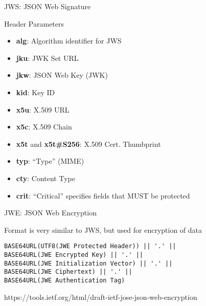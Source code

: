 \begin{frame}{JWS: JSON Web Signature}

Header Parameters

\begin{itemize}
\itemsep1pt\parskip0pt
\item
  \textbf{alg}: Algorithm identifier for JWS
\item
  \textbf{jku}: JWK Set URL
\item
  \textbf{jkw}: JSON Web Key (JWK)
\item
  \textbf{kid}: Key ID
\item
  \textbf{x5u}: X.509 URL
\item
  \textbf{x5c}: X.509 Chain
\item
  \textbf{x5t} and \textbf{x5t\#S256}: X.509 Cert. Thumbprint
\item
  \textbf{typ}: ``Type'' (MIME)
\item
  \textbf{cty}: Content Type
\item
  \textbf{crit}: ``Critical'' specifies fields that MUST be protected
\end{itemize}

\end{frame}

\begin{frame}[fragile]{JWE: JSON Web Encryption}

Format is very similar to JWS, but used for encryption of data

\begin{verbatim}
BASE64URL(UTF8(JWE Protected Header)) || '.' ||
BASE64URL(JWE Encrypted Key) || '.' ||
BASE64URL(JWE Initialization Vector) || '.' ||
BASE64URL(JWE Ciphertext) || '.' ||
BASE64URL(JWE Authentication Tag)
\end{verbatim}

https://tools.ietf.org/html/draft-ietf-jose-json-web-encryption

\end{frame}

